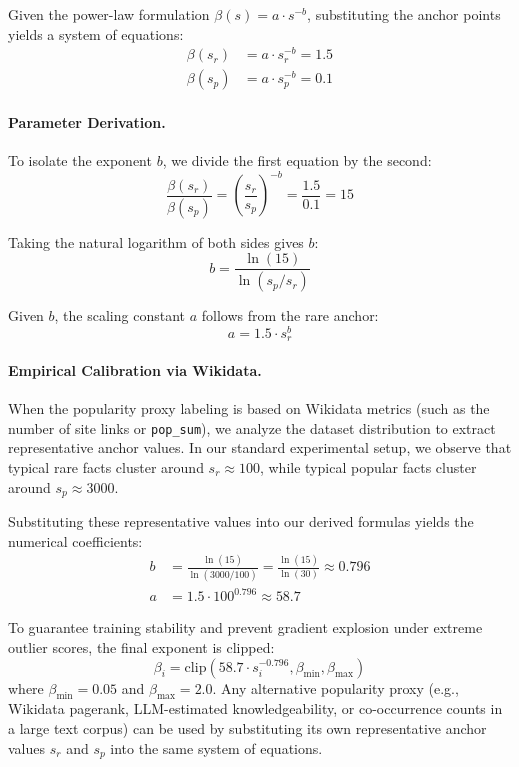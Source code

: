 Given the power-law formulation $\beta(s) = a \cdot s^{-b}$, substituting the anchor points yields a system of equations:
\begin{align}
    \beta(s_r) &= a \cdot s_r^{-b} = 1.5 \\
    \beta(s_p) &= a \cdot s_p^{-b} = 0.1
\end{align}

\paragraph{Parameter Derivation.}
To isolate the exponent $b$, we divide the first equation by the second:
\begin{equation}
    \frac{\beta(s_r)}{\beta(s_p)} = \left(\frac{s_r}{s_p}\right)^{-b} = \frac{1.5}{0.1} = 15
\end{equation}

Taking the natural logarithm of both sides gives $b$:
\begin{equation}
    b = \frac{\ln(15)}{\ln(s_p / s_r)}
\end{equation}

Given $b$, the scaling constant $a$ follows from the rare anchor:
\begin{equation}
    a = 1.5 \cdot s_r^b
\end{equation}

\paragraph{Empirical Calibration via Wikidata.}
When the popularity proxy labeling is based on Wikidata metrics (such as the number of site links or \texttt{pop\_sum}), we analyze the dataset distribution to extract representative anchor values. In our standard experimental setup, we observe that typical rare facts cluster around $s_r \approx 100$, while typical popular facts cluster around $s_p \approx 3000$.

Substituting these representative values into our derived formulas yields the numerical coefficients:
\begin{align}
    b &= \frac{\ln(15)}{\ln(3000 / 100)} = \frac{\ln(15)}{\ln(30)} \approx 0.796 \\
    a &= 1.5 \cdot 100^{0.796} \approx 58.7
\end{align}

To guarantee training stability and prevent gradient explosion under extreme outlier scores, the final exponent is clipped:
\begin{equation}
    \beta_i = \mathrm{clip}\left(58.7 \cdot s_i^{-0.796}, \beta_{\min}, \beta_{\max}\right)
\end{equation}
where $\beta_{\min} = 0.05$ and $\beta_{\max} = 2.0$. Any alternative popularity proxy (e.g., Wikidata pagerank, LLM-estimated knowledgeability, or co-occurrence counts in a large text corpus) can be used by substituting its own representative anchor values $s_r$ and $s_p$ into the same system of equations.

